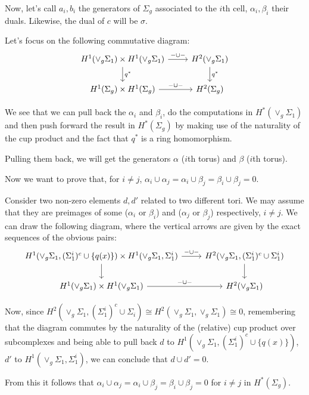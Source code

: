 \documentclass{article}
\begin{document}
Now, let's call $a_i,b_i$ the generators of $\Sigma_g$ associated to the $i$th
cell, $\alpha_i,\beta_i$ their duals. Likewise, the dual of $c$ will be
$\sigma$.

Let's focus on the following commutative diagram:
\[
    \begin{tikzcd}
        H^1(\vee_g\Sigma_1)\times
        H^1(\vee_g\Sigma_1)\arrow{d}{q^*}\arrow{r}{-\cup-}
        & H^2(\vee_g\Sigma_1)\arrow{d}{q^*} \\
        H^1(\Sigma_g)\times H^1(\Sigma_g)\arrow{r}{-\cup-}
        & H^2(\Sigma_g)
    \end{tikzcd}
\]

We see that we can pull back the $\alpha_i$ and $\beta_i$, do the computations
in $H^*(\vee_g\Sigma_1)$ and then push forward the result in $H^*(\Sigma_g)$ by
making use of the naturality of the cup product and the fact that $q^*$ is a
ring homomorphism.

Pulling them back, we will get the generators $\alpha$ ($i$th torus) and $\beta$
($i$th torus).

Now we want to prove that, for $i\neq j$,
$\alpha_i\cup\alpha_j=\alpha_i\cup\beta_j=\beta_i\cup\beta_j=0$.

Consider two non-zero elements $d,d'$ related to two different tori. We may
assume that they are preimages of some ($\alpha_i$ or $\beta_i$) and
($\alpha_j$ or $\beta_j$) respectively, $i\neq j$. We can draw
the following diagram, where the vertical arrows are given by the exact
sequences of the obvious pairs:
\[
    \begin{tikzcd}
        H^1(\vee_g\Sigma_1,(\Sigma^i_1)^c\cup\{q(x)\})\times
        H^1(\vee_g\Sigma_1,\Sigma^i_1)\arrow{d}\arrow{r}{-\cup-}
        & H^2(\vee_g\Sigma_1,(\Sigma^i_1)^c\cup\Sigma^i_1)\arrow{d} \\
        H^1(\vee_g\Sigma_1)\times H^1(\vee_g\Sigma_1)\arrow{r}{-\cup-}
        & H^2(\vee_g\Sigma_1)
    \end{tikzcd}
\]

Now, since $H^2(\vee_g\Sigma_1,(\Sigma^i_1)^c\cup\Sigma_i)\cong
H^2(\vee_g\Sigma_1,\vee_g\Sigma_1)\cong 0$, remembering that the diagram
commutes by the naturality of the (relative) cup product over subcomplexes
and being able to pull back $d$ to $H^1(\vee_g\Sigma_1,(\Sigma^i_1)^c\cup\{q(x)\})$, $d'$ to
$H^1(\vee_g\Sigma_1,\Sigma^i_1)$, we can conclude that $d\cup d'=0$.

From this it follows that
$\alpha_i\cup\alpha_j=\alpha_i\cup\beta_j=\beta_i\cup\beta_j=0$ for $i\neq j$ in
$H^*(\Sigma_g)$.
\end{document}
